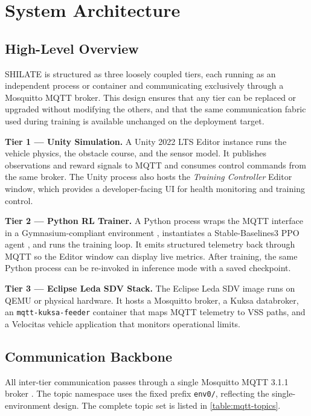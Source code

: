 \chapter{System Architecture}\label{ch:architecture}
\thispagestyle{pagestyle}

\section{High-Level Overview}
\label{sec:arch-overview}

SHILATE is structured as three loosely coupled tiers, each running as an
independent process or container and communicating exclusively through a
Mosquitto MQTT broker. This design ensures that any tier can be replaced
or upgraded without modifying the others, and that the same communication
fabric used during training is available unchanged on the deployment
target.

\textbf{Tier 1 --- Unity Simulation.} A Unity 2022 LTS Editor instance
runs the vehicle physics, the obstacle course, and the sensor model. It
publishes observations and reward signals to MQTT and consumes control
commands from the same broker. The Unity process also hosts the
\textit{Training Controller} Editor window, which provides a
developer-facing UI for health monitoring and training control.

\textbf{Tier 2 --- Python RL Trainer.} A Python process wraps the MQTT
interface in a Gymnasium-compliant environment \cite{Towers2024},
instantiates a Stable-Baselines3 PPO agent \cite{Raffin2021}, and runs
the training loop. It emits structured telemetry back through MQTT so the
Editor window can display live metrics. After training, the same Python
process can be re-invoked in inference mode with a saved checkpoint.

\textbf{Tier 3 --- Eclipse Leda SDV Stack.} The Eclipse Leda SDV image
\cite{EclipseLeda2023} runs on QEMU or physical hardware. It hosts a
Mosquitto broker, a Kuksa databroker, an \texttt{mqtt-kuksa-feeder}
container that maps MQTT telemetry to VSS paths, and a Velocitas vehicle
application that monitors operational limits.

\section{Communication Backbone}
\label{sec:mqtt-topics}

All inter-tier communication passes through a single Mosquitto MQTT 3.1.1
broker \cite{OASIS2014}. The topic namespace uses the fixed prefix
\texttt{env0/}, reflecting the single-environment design. The complete
topic set is listed in \cref{table:mqtt-topics}.

